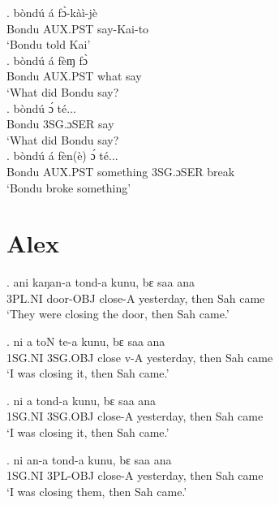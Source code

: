 \documentclass{assets/fieldnotes}
\begin{document}
\exg. bòndú á fɔ̀-kàì-jè\\
Bondu AUX.PST say-Kai-to\\
`Bondu told Kai'\\

\exg. bòndú á fèɱ fɔ̀\\
Bondu AUX.PST what say\\
`What did Bondu say?\\

\exg. bòndú ɔ́ té...\\
Bondu 3SG.ɔSER say\\
`What did Bondu say? \\

\exg. bòndú á fèn(è) ɔ́ té...\\
Bondu AUX.PST something 3SG.ɔSER break\\
`Bondu broke something' \\



\section{Alex}

\exg.
ani      kaŋan-a    tond-a    kunu,        bɛ     saa   ana  \\
3PL.NI   door-OBJ   close-A   yesterday,   then   Sah   came \\%
`They were closing the door, then Sah came.'

\exg.
ni       a         toN     te-a   kunu,        bɛ     saa   ana  \\
1SG.NI   3SG.OBJ   close   v-A    yesterday,   then   Sah   came \\%
`I was closing it, then Sah came.' \label{62301}

\exg.
ni       a         tond-a    kunu,        bɛ     saa   ana  \\
1SG.NI   3SG.OBJ   close-A   yesterday,   then   Sah   came \\%
`I was closing it, then Sah came.' \label{32115}


\exg.
ni       an-a      tond-a    kunu,        bɛ     saa   ana  \\
1SG.NI   3PL-OBJ   close-A   yesterday,   then   Sah   came \\%
`I was closing them, then Sah came.'
\end{document}
